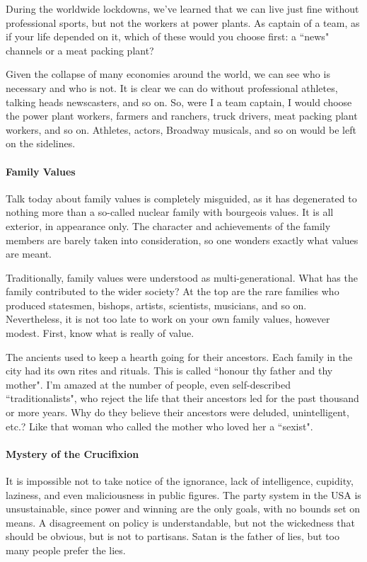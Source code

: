During the worldwide lockdowns, we've learned that we can live just fine without professional sports, but not the workers at power plants. As captain of a team, as if your life depended on it, which of these would you choose first: a ``news" channels or a meat packing plant?

Given the collapse of many economies around the world, we can see who is necessary and who is not. It is clear we can do without professional athletes, talking heads newscasters, and so on. So, were I a team captain, I would choose the power plant workers, farmers and ranchers, truck drivers, meat packing plant workers, and so on. Athletes, actors, Broadway musicals, and so on would be left on the sidelines.

\paragraph{Family Values}
Talk today about family values is completely misguided, as it has degenerated to nothing more than a so-called nuclear family with bourgeois values. It is all exterior, in appearance only. The character and achievements of the family members are barely taken into consideration, so one wonders exactly what values are meant.

Traditionally, family values were understood as multi-generational. What has the family contributed to the wider society? At the top are the rare families who produced statesmen, bishops, artists, scientists, musicians, and so on. Nevertheless, it is not too late to work on your own family values, however modest. First, know what is really of value.

The ancients used to keep a hearth going for their ancestors. Each family in the city had its own rites and rituals. This is called ``honour thy father and thy mother". I'm amazed at the number of people, even self-described ``traditionalists", who reject the life that their ancestors led for the past thousand or more years. Why do they believe their ancestors were deluded, unintelligent, etc.? Like that woman who called the mother who loved her a ``sexist".

\paragraph{Mystery of the Crucifixion}
It is impossible not to take notice of the ignorance, lack of intelligence, cupidity, laziness, and even maliciousness in public figures. The party system in the USA is unsustainable, since power and winning are the only goals, with no bounds set on means. A disagreement on policy is understandable, but not the wickedness that should be obvious, but is not to partisans. Satan is the father of lies, but too many people prefer the lies.

